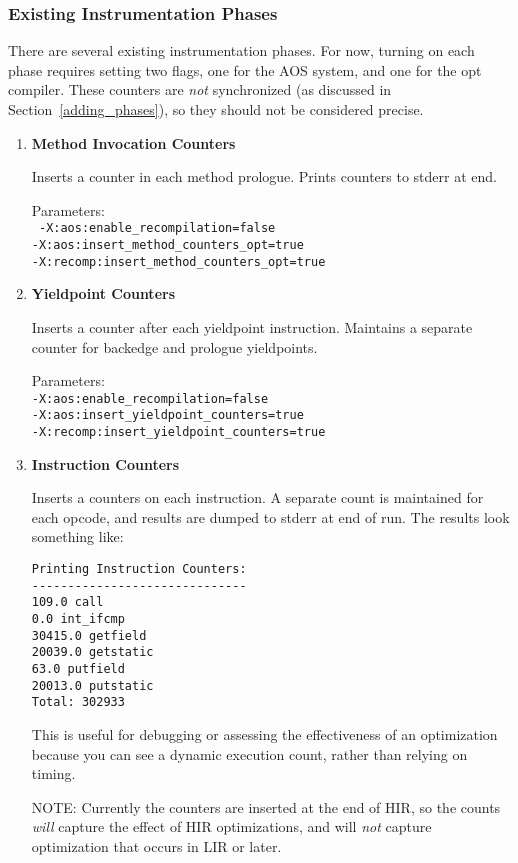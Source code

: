 \subsubsection{Existing Instrumentation Phases}
\label{existing_phases}
There are several existing instrumentation phases.  For now,
turning on each phase requires setting two flags, one for the AOS
system, and one for the opt compiler.  These counters are {\em not}
synchronized (as discussed in Section~\ref{adding_phases}), so they
should not be considered precise.
\begin{enumerate}
\item {\bf Method Invocation Counters} 

Inserts a counter in each method prologue.  Prints counters to stderr
at end.

Parameters: \\
{\tt
-X:aos:enable\_recompilation=false \\
-X:aos:insert\_method\_counters\_opt=true \\
-X:recomp:insert\_method\_counters\_opt=true}

\item {\bf Yieldpoint Counters}  

Inserts a counter after each yieldpoint instruction.  Maintains a
separate counter for backedge and prologue yieldpoints.

Parameters:\\
{\tt -X:aos:enable\_recompilation=false \\
-X:aos:insert\_yieldpoint\_counters=true \\
-X:recomp:insert\_yieldpoint\_counters=true}

\item {\bf Instruction Counters}  

Inserts a counters on each instruction.  A separate count is
maintained for each opcode, and results are dumped to stderr at end of
run. The results look something like:

\begin{verbatim}
Printing Instruction Counters:
------------------------------
109.0 call
0.0 int_ifcmp
30415.0 getfield
20039.0 getstatic
63.0 putfield
20013.0 putstatic
Total: 302933
\end{verbatim}

This is useful for debugging or assessing the effectiveness
of an optimization because you can see a dynamic execution count, rather
than relying on timing.  

NOTE: Currently the counters are inserted at the end of HIR, so the
counts {\em will} capture the effect of HIR optimizations, and will
{\em not} capture optimization that occurs in LIR or later.  


\end{enumerate}

